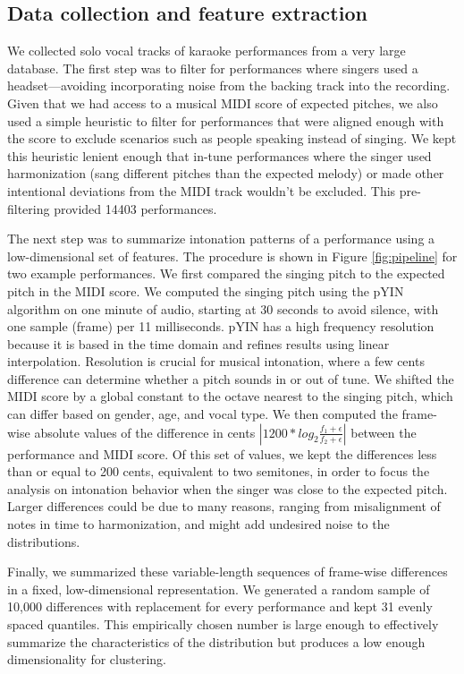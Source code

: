 \begin{appendices}
\section{Data collection and feature extraction}
\label{sec:features}
We collected solo vocal tracks of karaoke performances from a very large database. The first step was to filter for performances where singers used a headset---avoiding incorporating noise from the backing track into the recording. Given that we had access to a musical MIDI score of expected pitches, we also used a simple heuristic to filter for performances that were aligned enough with the score to exclude scenarios such as people speaking instead of singing. We kept this heuristic lenient enough that in-tune performances where the singer used harmonization (sang different pitches than the expected melody) or made other intentional deviations from the MIDI track wouldn't be excluded. This pre-filtering provided 14403 performances. 

The next step was to summarize intonation patterns of a performance using a low-dimensional set of features. The procedure is shown in Figure \ref{fig:pipeline} for two example performances. We first compared the singing pitch to the expected pitch in the MIDI score. We computed the singing pitch using the pYIN algorithm \cite{mauch2014pyin} on one minute of audio, starting at 30 seconds to avoid silence, with one sample (frame) per 11 milliseconds. pYIN has a high frequency resolution because it is based in the time domain and refines results using linear interpolation. Resolution is crucial for musical intonation, where a few cents difference can determine whether a pitch sounds in or out of tune. We shifted the MIDI score by a global constant to the octave nearest to the singing pitch, which can differ based on gender, age, and vocal type. We then computed the frame-wise absolute values of the difference in cents $\left| 1200 * log_2 \frac{f_1 + \epsilon} {f_2 + \epsilon} \right|$ between the performance and MIDI score. Of this set of values, we kept the differences less than or equal to 200 cents, equivalent to two semitones, in order to focus the analysis on intonation behavior when the singer was close to the expected pitch. Larger differences could be due to many reasons, ranging from misalignment of notes in time to harmonization, and might add undesired noise to the distributions. 

Finally, we summarized these variable-length sequences of frame-wise differences in a fixed, low-dimensional representation. We generated a random sample of 10,000 differences with replacement for every performance and kept 31 evenly spaced quantiles. This empirically chosen number is large enough to effectively summarize the characteristics of the distribution but produces a low enough dimensionality for clustering.


\end{appendices}
